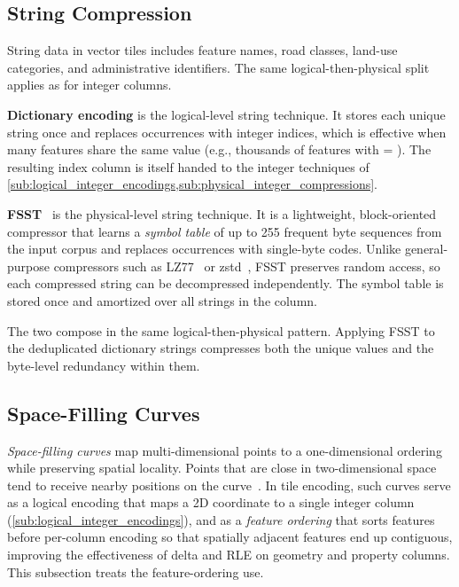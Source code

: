 \subsection{String Compression}\label{sub:string_compression}

String data in vector tiles includes feature names, road classes, land-use categories, and administrative identifiers.
The same logical-then-physical split applies as for integer columns.

\textbf{Dictionary encoding} is the logical-level string technique.
It stores each unique string once and replaces occurrences with integer indices, which is effective when many features share the same value (e.g., thousands of features with  = ).
The resulting index column is itself handed to the integer techniques of \cref{sub:logical_integer_encodings,sub:physical_integer_compressions}.

\textbf{\acf{FSST}}~\cite{bonczFSSTFastRandom2020} is the physical-level string technique.
It is a lightweight, block-oriented compressor that learns a \emph{symbol table} of up to 255 frequent byte sequences from the input corpus and replaces occurrences with single-byte codes.
Unlike general-purpose compressors such as LZ77~\cite{zivUniversalAlgorithmSequential1977} or zstd~\cite{colletZstandardCompressionApplication2021}, \ac{FSST} preserves random access, so each compressed string can be decompressed independently.
The symbol table is stored once and amortized over all strings in the column.

The two compose in the same logical-then-physical pattern.
Applying \ac{FSST} to the deduplicated dictionary strings compresses both the unique values and the byte-level redundancy within them.

\subsection{Space-Filling Curves}\label{sub:space_filling_curves}

\emph{Space-filling curves} map multi-dimensional points to a one-dimensional ordering while preserving spatial locality.
Points that are close in two-dimensional space tend to receive nearby positions on the curve~\cite{moonAnalysisClusteringProperties2001}.
In tile encoding, such curves serve as a logical encoding that maps a 2D coordinate to a single integer column (\cref{sub:logical_integer_encodings}), and as a \emph{feature ordering} that sorts features before per-column encoding so that spatially adjacent features end up contiguous, improving the effectiveness of delta and \ac{RLE} on geometry and property columns.
This subsection treats the feature-ordering use.

